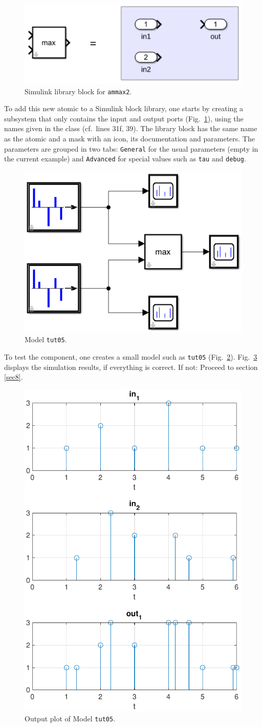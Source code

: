 \documentclass[12pt,oneside,a4paper,bibtotoc,BCOR=0pt,DIV=20]{scrreprt}
\newcommand{\cft}[1]{\mbox{\texttt{#1}}}   %
\begin{document}
\begin{figure}[ht]
\centering
\includegraphics[width=0.40\columnwidth]{images/bild12.pdf}
\caption{Simulink library block for \cft{am\:max2}.}
\label{fig_12}
\end{figure}

To add this new atomic to a Simulink block library, one starts by creating a
subsystem that only contains the input and output ports (Fig.\ \ref{fig_12}),
using the names given in the class (cf.\ lines 31f, 39). The library block has
the same name as the atomic and a mask with an icon, its documentation and
parameters. The parameters are grouped in two tabs: \cft{General} for the usual
parameters (empty in the current example) and \cft{Advanced} for special values
such as \cft{tau} and \cft{debug}.

\begin{figure}[ht]
\centering
\includegraphics[width=0.33\columnwidth]{images/bild13.pdf}
\caption{Model \cft{tut05}.}
\label{fig_13}
\end{figure}

To test the component, one creates a small model such as \cft{tut05}
(Fig.\ \ref{fig_13}). Fig.\ \ref{fig_14} displays the simulation results, if
everything is correct. If not: Proceed to section \ref{sec8}.


\begin{figure}[ht]
\centering
\includegraphics[width=0.32\columnwidth]{images/bild14.pdf}
\caption{Output plot of Model \cft{tut05}.}
\label{fig_14}
\end{figure}
\end{document}
